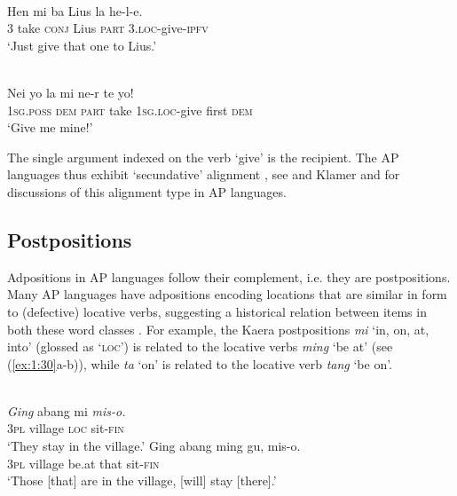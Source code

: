 \ea%
\label{ex:1:28}
   \\
\gll Hen  mi  ba  Lius  la   he-l-e. \\
3  take  \textsc{conj} Lius  \textsc{part} 3.\textsc{loc}{}-give-\textsc{ipfv}   \\
\glt `Just give that one to Lius.' 
\z









\ea%
\label{ex:1:29}
   \\
\gll Nei  yo  la  mi  ne-r  te  yo! \\
\textsc{1sg.poss}  \textsc{dem}  \textsc{part} take  1\textsc{sg.loc}{}-give  first  \textsc{dem}    \\
\glt `Give me mine!' 
\z
 
The single argument indexed on the verb `give' is the recipient. The AP languages thus exhibit `secundative' alignment \citep{Dryer1986}, see \citet{Klamer2010ditransitive} and Klamer and \citet{Schapper2012} for discussions of this alignment type in AP languages.

\subsection{Postpositions}\label{sec:1:5.6}
Adpositions in AP languages follow their complement, i.e. they are postpositions. Many AP languages have adpositions encoding locations that are similar in form to (defective) locative verbs, suggesting a historical relation between items in both these word classes \citep{KlamertoappearTypology}. For example, the Kaera postpositions \textit{mi} `in, on, at, into' (glossed as `\textsc{loc')}  is related to the locative verbs \textit{ming} `be at' (see (\ref{ex:1:30}a-b)), while \textit{ta} `on' is related to the locative verb \textit{tang} `be on'. 



\ea%
\label{ex:1:30}
\ea
{}\\
\gll \textit{Ging} {\ob}abang  mi{\cb}  \textit{mis-o.}  \\
  \textsc{3pl} village  \textsc{loc} sit-\textsc{fin}  \\
\glt `They stay in the village.' 
\ex
\gll Ging  abang   ming  gu,   mis-o. \\
\textsc{3pl} village  be.at  that  sit-\textsc{fin}   \\
\glt `Those [that] are in the village, [will] stay [there].'
\z\z
 
